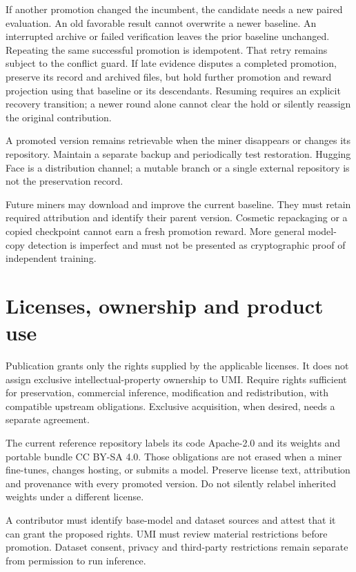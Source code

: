 If another promotion changed the incumbent, the candidate needs a new paired
evaluation. An old favorable result cannot overwrite a newer baseline.
An interrupted archive or failed verification leaves the prior baseline
unchanged. Repeating the same successful promotion is idempotent.
That retry remains subject to the conflict guard. If late evidence disputes a
completed promotion, preserve its record and archived files, but hold further
promotion and reward projection using that baseline or its descendants.
Resuming requires an explicit recovery transition; a newer round alone cannot
clear the hold or silently reassign the original contribution.

A promoted version remains retrievable when the miner disappears or changes
its repository. Maintain a separate backup and periodically test restoration.
Hugging Face is a distribution channel; a mutable branch or a single external
repository is not the preservation record.

Future miners may download and improve the current baseline. They must retain
required attribution and identify their parent version. Cosmetic repackaging
or a copied checkpoint cannot earn a fresh promotion reward. More general
model-copy detection is imperfect and must not be presented as cryptographic
proof of independent training.

\section{Licenses, ownership and product use}\label{6-licenses-ownership-and-product-use}

Publication grants only the rights supplied by the applicable licenses.
It does not assign exclusive intellectual-property ownership to UMI.
Require rights sufficient for preservation, commercial inference,
modification and redistribution, with compatible upstream obligations.
Exclusive acquisition, when desired, needs a separate agreement.

The current reference repository labels its code Apache-2.0 and its weights
and portable bundle CC BY-SA 4.0. Those obligations are not erased when a miner
fine-tunes, changes hosting, or submits a model. Preserve license text,
attribution and provenance with every promoted version. Do not silently
relabel inherited weights under a different license.

A contributor must identify base-model and dataset sources and attest that
it can grant the proposed rights. UMI must review material restrictions
before promotion. Dataset consent, privacy and third-party restrictions
remain separate from permission to run inference.

